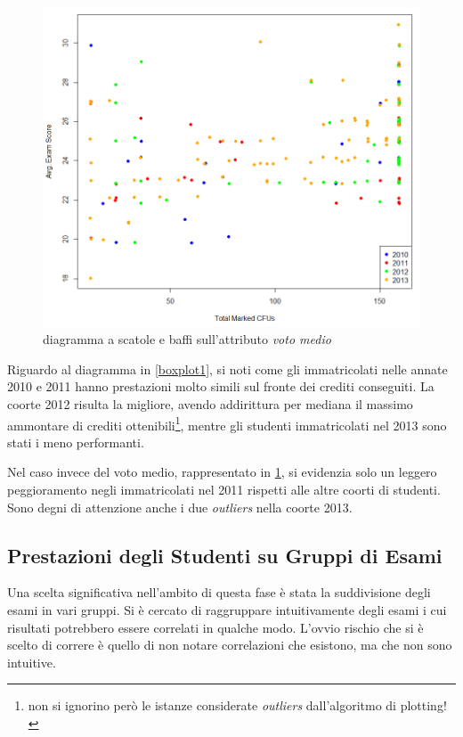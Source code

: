             \begin{figure}
                \centering
                \caption{diagramma a scatole e baffi sull'attributo \textit{voto medio}}
                \label{boxplot2}
            	\includegraphics[scale=0.5]{img/scatter_plot_3.png}
            \end{figure}

            Riguardo al diagramma in \ref{boxplot1}, si noti come gli immatricolati nelle annate 2010 e 2011 hanno prestazioni molto simili sul fronte dei crediti conseguiti. La coorte 2012 risulta la migliore, avendo addirittura per mediana il massimo ammontare di crediti ottenibili\footnote{non si ignorino però le istanze considerate \textit{outliers} dall’algoritmo di plotting!}, mentre gli studenti immatricolati nel 2013 sono stati i meno performanti.

            Nel caso invece del voto medio, rappresentato in \ref{boxplot2}, si evidenzia solo un leggero peggioramento negli immatricolati nel 2011 rispetti alle altre coorti di studenti. Sono degni di attenzione anche i due \textit{outliers} nella coorte 2013.

        \subsection{Prestazioni degli Studenti su Gruppi di Esami}

            Una scelta significativa nell’ambito di questa fase è stata la suddivisione degli esami in vari gruppi. Si è cercato di raggruppare intuitivamente degli esami i cui risultati potrebbero essere correlati in qualche modo. L’ovvio rischio che si è scelto di correre è quello di non notare correlazioni che esistono, ma che non sono intuitive. \\

